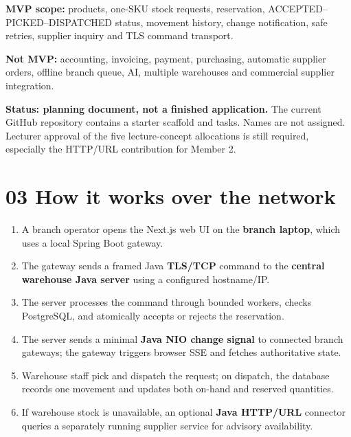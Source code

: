 \documentclass[10pt,a4paper]{article}
\begin{document}
\textbf{MVP scope:} products, one-SKU stock requests, reservation, ACCEPTED--PICKED--DISPATCHED status, movement history, change notification, safe retries, supplier inquiry and TLS command transport.

\textbf{Not MVP:} accounting, invoicing, payment, purchasing, automatic supplier orders, offline branch queue, AI, multiple warehouses and commercial supplier integration.

\begin{warnbox}
\textbf{Status: planning document, not a finished application.} The current GitHub repository contains a starter scaffold and tasks. Names are not assigned. Lecturer approval of the five lecture-concept allocations is still required, especially the HTTP/URL contribution for Member 2.
\end{warnbox}

\newpage

\section*{03 \quad How it works over the network}
\begin{enumerate}
\item A branch operator opens the Next.js web UI on the \textbf{branch laptop}, which uses a local Spring Boot gateway.
\item The gateway sends a framed Java \textbf{TLS/TCP} command to the \textbf{central warehouse Java server} using a configured hostname/IP.
\item The server processes the command through bounded workers, checks PostgreSQL, and atomically accepts or rejects the reservation.
\item The server sends a minimal \textbf{Java NIO change signal} to connected branch gateways; the gateway triggers browser SSE and fetches authoritative state.
\item Warehouse staff pick and dispatch the request; on dispatch, the database records one movement and updates both on-hand and reserved quantities.
\item If warehouse stock is unavailable, an optional \textbf{Java HTTP/URL} connector queries a separately running supplier service for advisory availability.
\end{enumerate}
\end{document}
